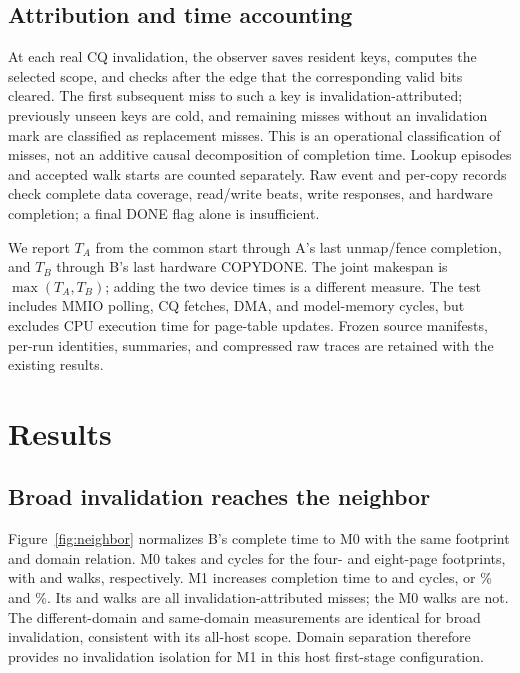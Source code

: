 \documentclass[sigconf,nonacm]{acmart}
\newcommand{\claim}[1]{} %
\begin{document}
\subsection{Attribution and time accounting}
At each real CQ invalidation, the observer saves resident keys, computes the selected scope, and checks after the edge that the corresponding valid bits cleared.\claim{C055}
The first subsequent miss to such a key is invalidation-attributed; previously unseen keys are cold, and remaining misses without an invalidation mark are classified as replacement misses.\claim{C056}
This is an operational classification of misses, not an additive causal decomposition of completion time. Lookup episodes and accepted walk starts are counted separately.\claim{C057}
Raw event and per-copy records check complete data coverage, read/write beats, write responses, and hardware completion; a final DONE flag alone is insufficient.\claim{C058}

We report $T_A$ from the common start through A's last unmap/fence completion, and $T_B$ through B's last hardware COPYDONE.\claim{C059}
The joint makespan is $\max(T_A,T_B)$; adding the two device times is a different measure.\claim{C060}
The test includes MMIO polling, CQ fetches, DMA, and model-memory cycles, but excludes CPU execution time for page-table updates.\claim{C061}
Frozen source manifests, per-run identities, summaries, and compressed raw traces are retained with the existing results.\claim{C062}

\section{Results}
\subsection{Broad invalidation reaches the neighbor}
Figure~\ref{fig:neighbor} normalizes B's complete time to M0 with the same footprint and domain relation.\claim{F002}
M0 takes \BaseTimeFour{} and \BaseTimeEight{} cycles for the four- and eight-page footprints, with \BaseWalkFour{} and \BaseWalkEight{} walks, respectively.\claim{C063}
M1 increases completion time to \WideTimeFour{} and \WideTimeEight{} cycles, or \BSlowMax\% and \BSlowMin\%.\claim{C064}
Its \WideWalkFour{} and \WideWalkEight{} walks are all invalidation-attributed misses; the M0 walks are not.\claim{C065}
The different-domain and same-domain measurements are identical for broad invalidation, consistent with its all-host scope.\claim{C066}
Domain separation therefore provides no invalidation isolation for M1 in this host first-stage configuration.\claim{C067}
\end{document}
